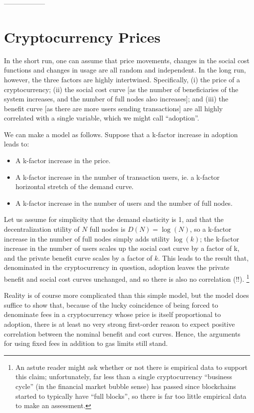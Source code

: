 \documentclass[12pt, final]{article}
\begin{document}
------------------

\section{Cryptocurrency Prices}

In the short run, one can assume that price movements, changes in the social cost functions and changes in usage are all random and independent. In the long run, however, the three factors are highly intertwined. Specifically, (i) the price of a cryptocurrency; (ii) the social cost curve [as the number of beneficiaries of the system increases, and the number of full nodes also increases]; and (iii) the benefit curve [as there are more users sending transactions] are all highly correlated with a single variable, which we might call ``adoption''.

We can make a model as follows. Suppose that a k-factor increase in adoption leads to:

\begin{itemize}
    \item A k-factor increase in the price.
    \item A k-factor increase in the number of transaction users, ie. a k-factor horizontal stretch of the demand curve.
    \item A k-factor increase in the number of users and the number of full nodes.
\end{itemize}

Let us assume for simplicity that the demand elasticity is 1, and that the decentralization utility of $N$ full nodes is $D(N) = \log(N)$, so a k-factor increase in the number of full nodes simply adds utility $\log(k)$; the k-factor increase in the number of users scales up the social cost curve by a factor of k, and the private benefit curve scales by a factor of $k$. This leads to the result that, denominated in the cryptocurrency in question, adoption leaves the private benefit and social cost curves unchanged, and so there is also no correlation (!!). \footnote{An astute reader might ask whether or not there is empirical data to support this claim; unfortunately, far less than a single cryptocurrency ``business cycle'' (in the financial market bubble sense) has passed since blockchains started to typically have ``full blocks'', so there is far too little empirical data to make an assessment.}

Reality is of course more complicated than this simple model, but the model does suffice to show that, because of the lucky coincidence of being forced to denominate fees in a cryptocurrency whose price is itself proportional to adoption, there is at least no very strong first-order reason to expect positive correlation between the nominal benefit and cost curves. Hence, the arguments for using fixed fees in addition to gas limits still stand.
\end{document}

